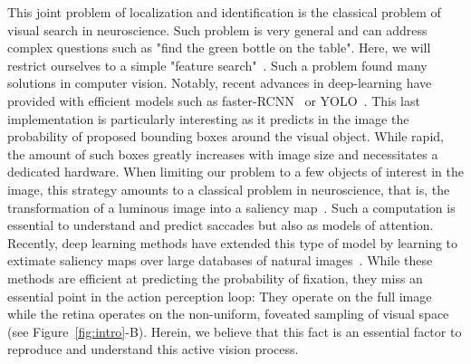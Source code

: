 This joint problem of localization and identification is the classical problem of visual search in neuroscience. Such problem is very general and can address complex questions such as "find the green bottle on the table". Here, we will restrict ourselves to a simple "feature search"~\citep{Treisman80}. Such a problem found many solutions in computer vision. Notably, recent advances in deep-learning have provided with efficient models such as faster-RCNN~\citep{Ren17} or YOLO~\citep{Redmon15}. This last implementation is particularly interesting as it predicts in the image the probability of proposed bounding boxes around the visual object. While rapid, the amount of such boxes greatly increases with image size and necessitates a dedicated hardware. When limiting our problem to a few objects of interest in the image, this strategy amounts to a classical problem in neuroscience, that is, the transformation of a luminous image into a saliency map~\citep{Itti01}. Such a computation is essential to understand and predict saccades but also as models of attention. Recently, deep learning methods have extended this type of model by learning to extimate saliency maps over large databases of natural images~\citep{Kummerer16}. While these methods are efficient at predicting the probability of fixation, they miss an essential point in the action perception loop: They operate on the full image while the retina operates on the non-uniform, foveated sampling of visual space (see Figure~\ref{fig:intro}-B). Herein, we believe that this fact is an essential factor to reproduce and understand this active vision process.

